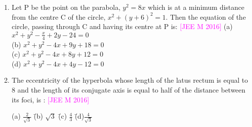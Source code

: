 \documentclass[journal,12pt,twocolumn]{IEEEtran}
\theoremstyle{remark}
\begin{document}
\begin{enumerate}[label=\textcolor{magenta}{\arabic*.}]
    \hfill{\textcolor{magenta}{[JEE M 2015]}}
    \begin{tabbing}
        (a) $\frac{27}{2}$ \hspace{2em} \= (b) $27$ \hspace{2em} \= (c) $\frac{27}{4}$ \hspace{2em} \= (d) 18 \\
    \end{tabbing}
    \item Let P be the point on the parabola, $y^2=8x$ which is at a minimum distance from the centre C of the circle, $x^2+(y+6)^2=1$. Then the equation of the circle, passing through C and having its centre at P is:
    \hfill{\textcolor{magenta}{[JEE M 2016]}}
    (a) $x^2+y^2-\frac{x}{4}+2y-24=0$\\
    (b) $x^2+y^2-4x+9y+18=0$\\
    (c) $x^2+y^2-4x+8y+12=0$\\
    (d) $x^2+y^2-4x+4y-12=0$\\
    \item The eccentricity of the hyperbola whose length of the latus rectum is equal to 8 and the length of its conjugate axis is equal to half of the distance between its foci, is :
    \hfill{\textcolor{magenta}{[JEE M 2016]}}
    \begin{tabbing}
        (a) $\frac{2}{\sqrt{3}}$ \hspace{2em} \= (b) $\sqrt{3}$ \hspace{2em} \= (c) $\frac{4}{3}$ \hspace{2em} \= (d)$\frac{4}{\sqrt{3}}$\\
    \end{tabbing}
    
\end{enumerate}
\end{document}
